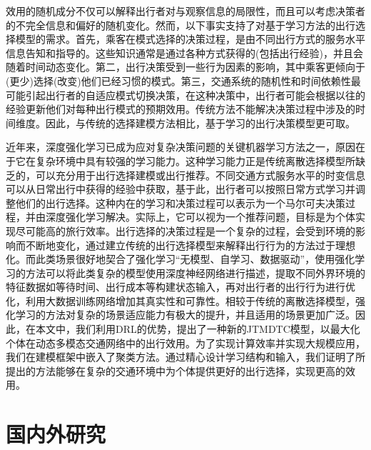 效用的随机成分不仅可以解释出行者对与观察信息的局限性，而且可以考虑决策者的不完全信息和偏好的随机变化。然而，以下事实支持了对基于学习方法的出行选择模型的需求。首先，乘客在模式选择的决策过程，是由不同出行方式的服务水平信息告知和指导的。这些知识通常是通过各种方式获得的(包括出行经验)，并且会随着时间动态变化。第二，出行决策受到一些行为因素的影响，其中乘客更倾向于(更少)选择(改变)他们已经习惯的模式。第三，交通系统的随机性和时间依赖性最可能引起出行者的自适应模式切换决策，在这种决策中，出行者可能会根据以往的经验更新他们对每种出行模式的预期效用。传统方法不能解决决策过程中涉及的时间维度。因此，与传统的选择建模方法相比，基于学习的出行决策模型更可取。

近年来，深度强化学习已成为应对复杂决策问题的关键机器学习方法之一，原因在于它在复杂环境中具有较强的学习能力。这种学习能力正是传统离散选择模型所缺乏的，可以充分用于出行选择建模或出行推荐。不同交通方式服务水平的时变信息可以从日常出行中获得的经验中获取，基于此，出行者可以按照日常方式学习并调整他们的出行选择。这种内在的学习和决策过程可以表示为一个马尔可夫决策过程，并由深度强化学习解决。实际上，它可以视为一个推荐问题，目标是为个体实现尽可能高的旅行效率。出行选择的决策过程是一个复杂的过程，会受到环境的影响而不断地变化，通过建立传统的出行选择模型来解释出行行为的方法过于理想化。而此类场景很好地契合了强化学习“无模型、自学习、数据驱动”，使用强化学习的方法可以将此类复杂的模型使用深度神经网络进行描述，提取不同外界环境的特征数据如等待时间、出行成本等构建状态输入，再对出行者的出行行为进行优化，利用大数据训练网络增加其真实性和可靠性。相较于传统的离散选择模型，强化学习的方法对复杂的场景适应能力有极大的提升，并且适用的场景更加广泛。因此，在本文中，我们利用DRL的优势，提出了一种新的JTMDTC模型，以最大化个体在动态多模态交通网络中的出行效用。为了实现计算效率并实现大规模应用，我们在建模框架中嵌入了聚类方法。通过精心设计学习结构和输入，我们证明了所提出的方法能够在复杂的交通环境中为个体提供更好的出行选择，实现更高的效用。



\section{国内外研究}


